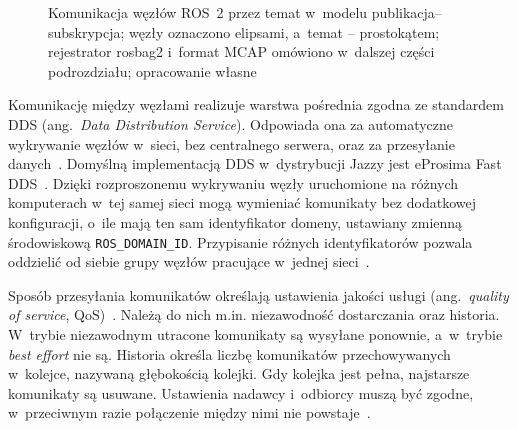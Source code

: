 \begin{figure}[H]
  \centering
  \caption{Komunikacja węzłów ROS~2 przez temat w~modelu publikacja--subskrypcja; węzły oznaczono elipsami, a~temat -- prostokątem; rejestrator rosbag2 i~format MCAP omówiono w~dalszej części podrozdziału; opracowanie własne}
  \label{rys:ros2_graf}
\end{figure}

Komunikację między węzłami realizuje warstwa pośrednia zgodna ze standardem DDS (ang.~\textit{Data Distribution Service}). Odpowiada ona za automatyczne wykrywanie węzłów w~sieci, bez centralnego serwera, oraz za przesyłanie danych~\cite{macenski2022}. Domyślną implementacją DDS w~dystrybucji Jazzy jest eProsima Fast DDS~\cite{ros2jazzy}. Dzięki rozproszonemu wykrywaniu węzły uruchomione na różnych komputerach w~tej samej sieci mogą wymieniać komunikaty bez dodatkowej konfiguracji, o~ile mają ten sam identyfikator domeny, ustawiany zmienną środowiskową \texttt{ROS\_DOMAIN\_ID}. Przypisanie różnych identyfikatorów pozwala oddzielić od siebie grupy węzłów pracujące w~jednej sieci~\cite{ros2jazzy}.

Sposób przesyłania komunikatów określają ustawienia jakości usługi (ang.~\textit{quality of service}, QoS)~\cite{ros2jazzy}. Należą do nich m.in. niezawodność dostarczania oraz historia. W~trybie niezawodnym utracone komunikaty są wysyłane ponownie, a~w~trybie \textit{best effort} nie są. Historia określa liczbę komunikatów przechowywanych w~kolejce, nazywaną głębokością kolejki. Gdy kolejka jest pełna, najstarsze komunikaty są usuwane. Ustawienia nadawcy i~odbiorcy muszą być zgodne, w~przeciwnym razie połączenie między nimi nie powstaje~\cite{ros2jazzy}.

